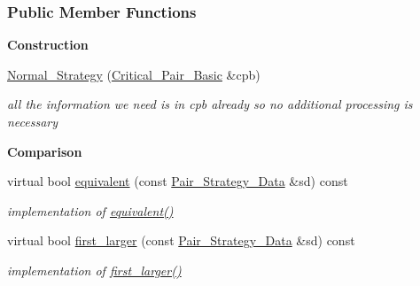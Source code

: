 \subsubsection*{Public Member Functions}
\begin{Indent}\textbf{ Construction}\par
\begin{DoxyCompactItemize}
\item 
\mbox{\label{group__strategygroup_a6aa0afb9976f32afc9ae55d54d0ff9d4}} 
\hyperlink{group__strategygroup_a6aa0afb9976f32afc9ae55d54d0ff9d4}{Normal\+\_\+\+Strategy} (\hyperlink{group___g_b_computation_class_critical___pair___basic}{Critical\+\_\+\+Pair\+\_\+\+Basic} \&cpb)
\begin{DoxyCompactList}\small\item\em all the information we need is in {\ttfamily cpb} already so no additional processing is necessary \end{DoxyCompactList}\end{DoxyCompactItemize}
\end{Indent}
\begin{Indent}\textbf{ Comparison}\par
\begin{DoxyCompactItemize}
\item 
\mbox{\label{group__strategygroup_a0e45af746d30c9608f48267aa2abb8d8}} 
virtual bool \hyperlink{group__strategygroup_a0e45af746d30c9608f48267aa2abb8d8}{equivalent} (const \hyperlink{group__strategygroup_class_pair___strategy___data}{Pair\+\_\+\+Strategy\+\_\+\+Data} \&sd) const
\begin{DoxyCompactList}\small\item\em implementation of \hyperlink{group__strategygroup_a0e45af746d30c9608f48267aa2abb8d8}{equivalent()} \end{DoxyCompactList}\item 
\mbox{\label{group__strategygroup_a2bc1a890ee5e2bee455fd8226389c232}} 
virtual bool \hyperlink{group__strategygroup_a2bc1a890ee5e2bee455fd8226389c232}{first\+\_\+larger} (const \hyperlink{group__strategygroup_class_pair___strategy___data}{Pair\+\_\+\+Strategy\+\_\+\+Data} \&sd) const
\begin{DoxyCompactList}\small\item\em implementation of \hyperlink{group__strategygroup_a2bc1a890ee5e2bee455fd8226389c232}{first\+\_\+larger()} \end{DoxyCompactList}\end{DoxyCompactItemize}
\end{Indent}
